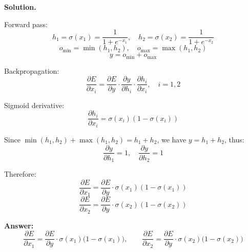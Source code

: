 \documentclass[a4paper,12pt]{article}
\begin{document}
\textbf{Solution.}

Forward pass:
\[
h_1 = \sigma(x_1) = \frac{1}{1+e^{-x_1}}, \quad
h_2 = \sigma(x_2) = \frac{1}{1+e^{-x_2}}
\]
\[
o_{\min} = \min(h_1, h_2), \quad o_{\max} = \max(h_1, h_2)
\]
\[
y = o_{\min} + o_{\max}
\]

Backpropagation:
\[
\frac{\partial E}{\partial x_i} = \frac{\partial E}{\partial y} \cdot \frac{\partial y}{\partial h_i} \cdot \frac{\partial h_i}{\partial x_i}, \quad i=1,2
\]

Sigmoid derivative:
\[
\frac{\partial h_i}{\partial x_i} = \sigma(x_i)(1 - \sigma(x_i))
\]

Since \(\min(h_1,h_2) + \max(h_1,h_2) = h_1 + h_2\), we have \(y = h_1 + h_2\), thus:
\[
\frac{\partial y}{\partial h_1} = 1, \quad \frac{\partial y}{\partial h_2} = 1
\]

Therefore:
\[
\frac{\partial E}{\partial x_1} = \frac{\partial E}{\partial y} \cdot \sigma(x_1)(1 - \sigma(x_1))
\]
\[
\frac{\partial E}{\partial x_2} = \frac{\partial E}{\partial y} \cdot \sigma(x_2)(1 - \sigma(x_2))
\]

\textbf{Answer:}
\[
\boxed{\frac{\partial E}{\partial x_1} = \frac{\partial E}{\partial y} \cdot \sigma(x_1)\bigl(1 - \sigma(x_1)\bigr)}, \qquad
\boxed{\frac{\partial E}{\partial x_2} = \frac{\partial E}{\partial y} \cdot \sigma(x_2)\bigl(1 - \sigma(x_2)\bigr)}
\]
\end{document}
